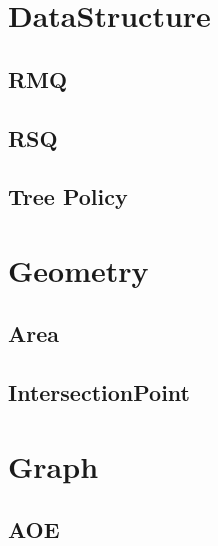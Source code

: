 \section{DataStructure}
\subsection{RMQ}

\subsection{RSQ}

\subsection{Tree Policy}


\section{Geometry}
\subsection{Area}

\subsection{IntersectionPoint}


\section{Graph}
\subsection{AOE}

